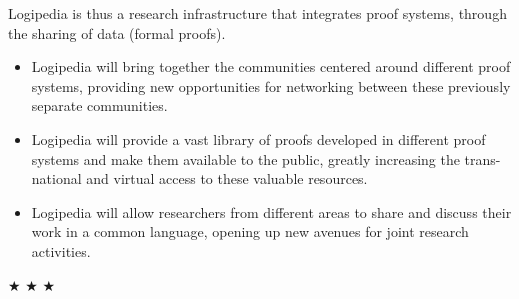 

Logipedia is thus a research infrastructure that integrates proof
systems, through the sharing of data (formal proofs).

\begin{itemize}
\item Logipedia will bring together the communities centered around
  different proof systems, providing new opportunities for networking
  between these previously separate communities.

\item Logipedia will provide a vast library of proofs developed in
  different proof systems and make them available to the public,
  greatly increasing the trans-national and virtual access to these
  valuable resources.

\item Logipedia will allow researchers from different areas to share
  and discuss their work in a common language, opening up new avenues
  for joint research activities.
\end{itemize}


\begin{center}
$\bigstar$ $\bigstar$ $\bigstar$
\end{center}

